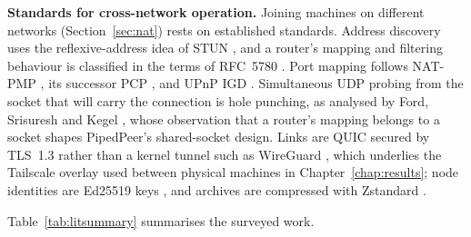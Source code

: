 \textbf{Standards for cross-network operation.} Joining machines on different
networks (Section~\ref{sec:nat}) rests on established standards. Address
discovery uses the reflexive-address idea of STUN \cite{rfc8489}, and a router's
mapping and filtering behaviour is classified in the terms of RFC~5780
\cite{rfc5780}. Port mapping follows NAT-PMP \cite{rfc6886}, its successor PCP
\cite{rfc6887}, and UPnP IGD \cite{upnpigd}. Simultaneous UDP probing from the
socket that will carry the connection is hole punching, as analysed by
Ford, Srisuresh and Kegel \cite{ford2005p2p}, whose observation that a router's
mapping belongs to a socket shapes PipedPeer's shared-socket design. Links are
QUIC \cite{rfc9000} secured by TLS~1.3 \cite{rfc8446} rather than a kernel
tunnel such as WireGuard \cite{donenfeld2017wireguard}, which underlies the
Tailscale overlay used between physical machines in Chapter~\ref{chap:results};
node identities are
Ed25519 keys \cite{bernstein2012ed25519}, and archives are compressed with
Zstandard \cite{rfc8878}.

Table~\ref{tab:litsummary} summarises the surveyed work.

